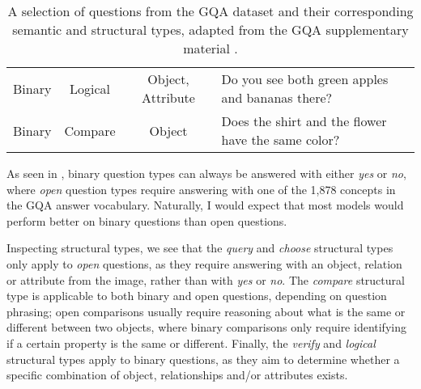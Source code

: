 \begin{table}[htbp]
\begin{footnotesize}
\begin{tabularx}{\linewidth}{cccL}
        Binary & Logical & Object, Attribute & Do you see both green apples and bananas there?\\
        Binary & Compare & Object & Does the shirt and the flower have the same color?\\
        \bottomrule
    \end{tabularx}
    \caption{A selection of questions from the GQA dataset and their corresponding semantic and structural types, adapted from the GQA supplementary material \cite{hudson2019gqa_preprint}.}
    \label{table:gqa_question_samples}
    \end{footnotesize}
\end{table}

As seen in \tableautorefname{ \ref{table:gqa_question_samples}}, binary question types can always be answered with either \textit{yes} or \textit{no}, where \textit{open} question types require answering with one of the 1,878 concepts in the GQA answer vocabulary. Naturally, I would expect that most models would perform better on binary questions than open questions.

Inspecting structural types, we see that the \textit{query} and \textit{choose} structural types only apply to \textit{open} questions, as they require answering with an object, relation or attribute from the image, rather than with \textit{yes} or \textit{no}. The \textit{compare} structural type is applicable to both binary and open questions, depending on question phrasing; open comparisons usually require reasoning about what is the same or different between two objects, where binary comparisons only require identifying if a certain property is the same or different. Finally, the \textit{verify} and \textit{logical} structural types apply to binary questions, as they aim to determine whether a specific combination of object, relationships and/or attributes exists.

